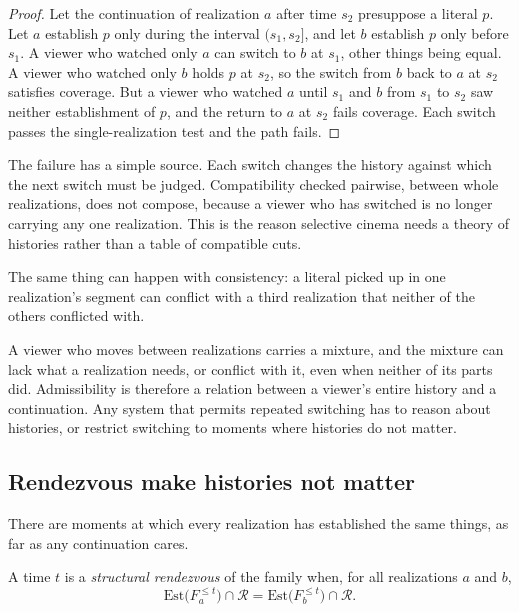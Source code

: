 \begin{proof}
Let the continuation of realization $a$ after time $s_2$ presuppose a literal $p$. Let $a$ establish $p$ only during the interval $(s_1,s_2]$, and let $b$ establish $p$ only before $s_1$. A viewer who watched only $a$ can switch to $b$ at $s_1$, other things being equal. A viewer who watched only $b$ holds $p$ at $s_2$, so the switch from $b$ back to $a$ at $s_2$ satisfies coverage. But a viewer who watched $a$ until $s_1$ and $b$ from $s_1$ to $s_2$ saw neither establishment of $p$, and the return to $a$ at $s_2$ fails coverage. Each switch passes the single-realization test and the path fails.
\end{proof}

\begin{remark}
The failure has a simple source. Each switch changes the history against which the next switch must be judged. Compatibility checked pairwise, between whole realizations, does not compose, because a viewer who has switched is no longer carrying any one realization. This is the reason selective cinema needs a theory of histories rather than a table of compatible cuts.
\end{remark}

The same thing can happen with consistency: a literal picked up in one realization's segment can conflict with a third realization that neither of the others conflicted with.

A viewer who moves between realizations carries a mixture, and the mixture can lack what a realization needs, or conflict with it, even when neither of its parts did. Admissibility is therefore a relation between a viewer's entire history and a continuation. Any system that permits repeated switching has to reason about histories, or restrict switching to moments where histories do not matter.

\subsection*{Rendezvous make histories not matter}

There are moments at which every realization has established the same things, as far as any continuation cares.

\begin{definition}
A time $t$ is a \emph{structural rendezvous} of the family when, for all realizations $a$ and $b$,
\begin{equation}
\mathrm{Est}\big(F_a^{\le t}\big)\cap\mathcal R=\mathrm{Est}\big(F_b^{\le t}\big)\cap\mathcal R .
\end{equation}
\end{definition}

